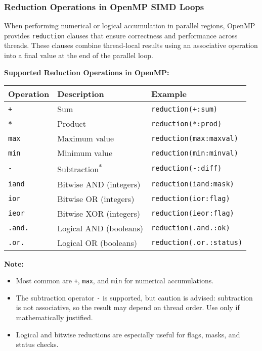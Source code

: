 \documentclass{article}
\begin{document}
\subsubsection{Reduction Operations in OpenMP SIMD Loops}

When performing numerical or logical accumulation in parallel regions, OpenMP provides \texttt{reduction} clauses that ensure correctness and performance across threads. These clauses combine thread-local results using an associative operation into a final value at the end of the parallel loop.

\vspace{1em}
\noindent
\textbf{Supported Reduction Operations in OpenMP:}

\begin{center}
\begin{tabular}{|l|l|l|}
\hline
\textbf{Operation} & \textbf{Description} & \textbf{Example} \\
\hline
\texttt{+} & Sum & \texttt{reduction(+:sum)} \\
\texttt{*} & Product & \texttt{reduction(*:prod)} \\
\texttt{max} & Maximum value & \texttt{reduction(max:maxval)} \\
\texttt{min} & Minimum value & \texttt{reduction(min:minval)} \\
\texttt{-} & Subtraction\textsuperscript{*} & \texttt{reduction(-:diff)} \\
\hline
\texttt{iand} & Bitwise AND (integers) & \texttt{reduction(iand:mask)} \\
\texttt{ior} & Bitwise OR (integers) & \texttt{reduction(ior:flag)} \\
\texttt{ieor} & Bitwise XOR (integers) & \texttt{reduction(ieor:flag)} \\
\hline
\texttt{.and.} & Logical AND (booleans) & \texttt{reduction(.and.:ok)} \\
\texttt{.or.} & Logical OR (booleans) & \texttt{reduction(.or.:status)} \\
\hline
\end{tabular}
\end{center}

\vspace{1em}
\noindent
\textbf{Note:}
\begin{itemize}
\item Most common are \texttt{+}, \texttt{max}, and \texttt{min} for numerical accumulations.
\item The subtraction operator \texttt{-} is supported, but caution is advised: subtraction is not associative, so the result may depend on thread order. Use only if mathematically justified.
\item Logical and bitwise reductions are especially useful for flags, masks, and status checks.
\end{itemize}
\end{document}
